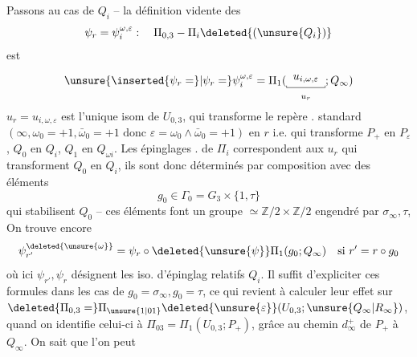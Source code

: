 Passons au cas de $Q_i$ -- la définition vidente  des
\[
\psi_r=\psi_i^{\omega,\varepsilon}:\quad\Pi_{0,3}-\Pi_i\deleted{(\unsure{Q_i})}
\]
est
\[
\unsure{\inserted{\psi_r=}|\psi_r=}\psi_i^{\omega,\varepsilon}=\Pi_1(\underset{u_r}{\begin{array}{@{}c@{}}u_{i,\omega,\varepsilon}\\[-1.1ex]\rule{0.4pt}{0.45ex}\rule{3.4em}{0.4pt}\rule{0.4pt}{0.45ex}\end{array}};Q_\infty)
\]
 $u_r=u_{i,\omega,\varepsilon}$ est l'unique isom de $U_{0,3}$,  qui transforme le repère . standard $(\infty,\omega_0=+1,\bar\omega_0=+1\text{ donc }\varepsilon=\omega_0\wedge\bar\omega_0=+1)$ en $r$ i.e. qui transforme $P_+$ en $P_\varepsilon$, $Q_0$ en $Q_i$, $Q_1$ en $Q_{\omega i}$. 
Les épinglages .  de $\Pi_i$ correspondent aux $u_r$ qui transforment $Q_0$ en $Q_i$, ils sont donc déterminés par composition avec des éléments
\[
g_0\in\Gamma_0=G_3\times\{1,\tau\}
\]
qui stabilisent $Q_0$ -- ces éléments  font un groupe $\simeq\mathbb Z/2\times\mathbb Z/2$ engendré par $\sigma_\infty,\tau$,  On trouve encore
\[
\psi_{r'}^{\deleted{\unsure{\omega}}}=\psi_r\circ\deleted{\unsure{\psi}}\Pi_1(g_0;Q_\infty)\quad\text{si }r'=r\circ g_0
\]
où ici $\psi_{r'},\psi_r$ désignent les iso. d'épinglag relatifs  $Q_i$. Il suffit d'expliciter ces formules dans les cas de $g_0=\sigma_\infty,g_0=\tau$, ce qui revient à calculer leur effet sur $\deleted{\Pi_{0,3}=}\Pi_{\unsure{1|01}}\deleted{\unsure{\varepsilon}}(U_{0,3};\unsure{Q_\infty|R_\infty})$, quand on identifie celui-ci à $\Pi_{03}=\Pi_1(U_{0,3};P_+)$, grâce au chemin $d_\infty^+$ de $P_+$ à $Q_\infty$. On sait que l'on peut

